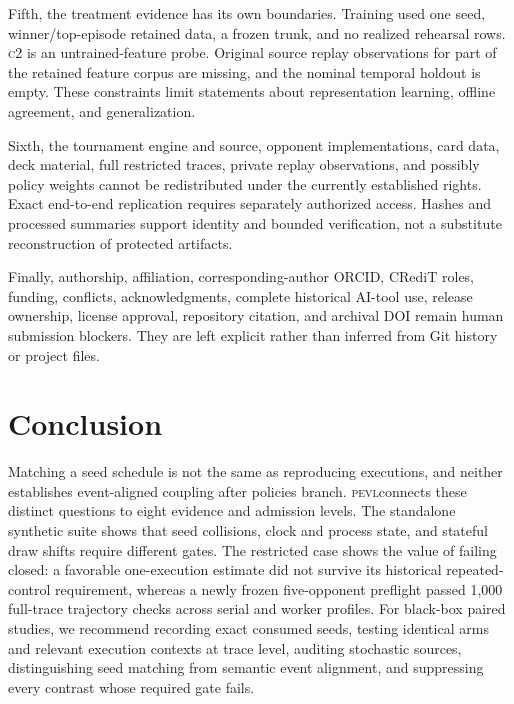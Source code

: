 \documentclass[aps,reprint,superscriptaddress,longbibliography,floatfix]{revtex4-2}
\newcommand{\PEVL}{\textsc{pevl}}
\newcommand{\CTwo}{\textsc{c2}}
\begin{document}
Fifth, the treatment evidence has its own boundaries.  Training used one seed,
winner/top-episode retained data, a frozen trunk, and no realized rehearsal
rows.  \CTwo{} is an untrained-feature probe.  Original source replay
observations for part of the retained feature corpus are missing, and the
nominal temporal holdout is empty.  These constraints limit statements about
representation learning, offline agreement, and generalization.

Sixth, the tournament engine and source, opponent implementations, card data,
deck material, full restricted traces, private replay observations, and
possibly policy weights cannot be redistributed under the currently established
rights.  Exact end-to-end replication requires separately authorized access.
Hashes and processed summaries support identity and bounded verification, not a
substitute reconstruction of protected artifacts.

Finally, authorship, affiliation, corresponding-author ORCID, CRediT roles,
funding, conflicts, acknowledgments, complete historical AI-tool use, release
ownership, license approval, repository citation, and archival DOI remain human
submission blockers.  They are left explicit rather than inferred from Git
history or project files.

\section{Conclusion}

Matching a seed schedule is not the same as reproducing executions, and neither
establishes event-aligned coupling after policies branch.  \PEVL connects these
distinct questions to eight evidence and admission levels.  The standalone synthetic
suite shows that seed collisions, clock and process state, and stateful draw
shifts require different gates.  The restricted case shows the value of failing
closed: a favorable one-execution estimate did not survive its historical
repeated-control requirement, whereas a newly frozen five-opponent preflight
passed 1,000 full-trace trajectory checks across serial and worker profiles.
For black-box paired studies, we recommend recording exact consumed seeds,
testing identical arms and relevant execution contexts at trace level, auditing
stochastic sources, distinguishing seed matching from semantic event alignment,
and suppressing every contrast whose required gate fails.
\end{document}
